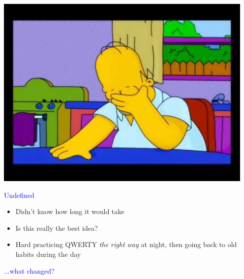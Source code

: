 \documentclass[landscape]{slides}
\begin{document}
\begin{slide}
    \includegraphics[width=\textwidth]{homer}
\end{slide}


\begin{slide}

    \textcolor{blue}{\Large{Undefined}}

    \begin{itemize}
        \item Didn't know how long it would take
        \item Is this really the best idea?
        \item Hard practicing QWERTY \emph{the right way} at night, then going back to old habits during the day
    \end{itemize}

\end{slide}


\begin{slide}

    \textcolor{blue}{\Large{...what changed?}}

\end{slide}
\end{document}
